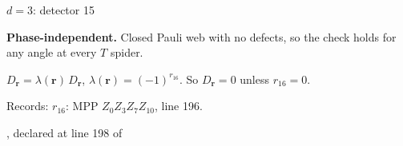 \label{d3_det015}
{\Large $d=3$: detector 15}\par
\textbf{Phase-independent.} Closed Pauli web with no defects, so the check holds for any angle at every $T$ spider.
\begin{center}
\end{center}
\vspace{-1mm}
$D_{\boldsymbol r}=\lambda(\boldsymbol r)\,D_{\boldsymbol r}$, \quad $\lambda(\boldsymbol r)=(-1)^{r_{16}}$. \qquad So $D_{\boldsymbol r}=0$ unless $r_{16}=0$.
\par\smallskip\begin{minipage}{.98\linewidth}\small Records: $r_{16}$: MPP $Z_{0}Z_{3}Z_{7}Z_{10}$, line 196.\end{minipage}
\vfill
{\footnotesize\texttt{}, declared at line 198 of \texttt{}}
\newpage

